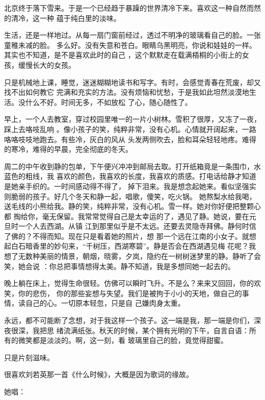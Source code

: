 \documentclass[12pt,a4paper]{article}
\begin{document}
		北京终于落下雪来。于是一个已经趋于暴躁的世界清冷下来。喜欢这一种自然而然的清冷，这一种
	蕴于纯白里的淡味。

		生活，还是一样地过。从每一扇门窗前经过，透过不明净的玻璃看自己的脸。一张童稚未减的脸。
	多么好。没有失意和苍白。眼睛乌黑明亮，你说和娃娃的一样。其实也不知道，是不是喜欢此时的自己
	，这个默默走在载满梧桐的小街上的女孩，缓慢长大的女孩。

		只是机械地上课，睡觉，迷迷糊糊地读书和写字。有时，会感觉青春在荒废，却又找不出如何教它
	完满和充实的方法。没有烦恼和忧愁，于是我如此坦然淡漠地生活。没什么不好。时间无多，不如放松
	了心，随心随性了。

		早上，一个人去教室，穿过校园里唯一的一片小树林。雪积了很厚，又冻了一夜，踩上去咯吱乱响
	。像小孩子的笑，纯粹非常，没有心机。心情就开阔起来，一路咯咯吱吱地跑去。有些冷，灰白的风从
	头发两侧吹去，脸和耳朵轻轻地疼。难得的寒冷，难得的早晨，完全彻底的冬天。

		周二的中午收到静的包单，下午便兴冲冲到邮局去取。打开纸箱竟是一条围巾，水蓝色的粗线，我
	喜欢的颜色，我喜欢的长度，我喜欢的质感。打电话给静才知道是她亲手织的。一时间感动得不得了，
	掉下泪来。我是想念起她来。看似坚强实则脆弱的孩子。好几个冬天和静一起，唱歌，傻笑，吃火锅。
	她熬梨水给我喝，送毛线的小熊给我。静的笑，纯粹非常，没有心机。雪一样。她对你好便把整颗心都
	掏给你，毫无保留。我常常觉得自己是太幸运的了，遇见了静。她说，要在元旦时一个人去西湖。从镇
	江到那里似乎是不太远。还要去灵隐寺拜佛。静何时信了佛的？不得而知。现在只是看着她的照片，想
	那一个远在江南的小女子。就想起白石暗香里的妙句来，“千树压，西湖寒碧”。静是否会在西湖遇见梅
	花呢？我想了无数种美丽的情景，朝烟，晓雾，夕岚，隐约在一树树迷梦里的静。静听了会笑，她会说
	：你总把事情想得太美。静不知道，我是多想同她一起去的。

		晚上躺在床上，觉得生命很轻。仿佛可以瞬时飞升。不是么？来来又回回，你的欢笑，你的悲伤，
	你的那些妄想与失望。我们是被拘于小小的天地，做自己的事情，读自己的心。一切原本轻忽，只是自
	己嫌肉身太重。

		永远，都不可能断了念想，对于我这样一个孩子。这一端是我，那一端是你们，深夜很深，我把思
	绪流满纸张。秋天的时候，某个拥有光明的下午，自言自语：所有的微笑都是淡淡的。啊，这一刻，看
	玻璃里自己的脸，竟觉得甜蜜。

		只是片刻滋味。

	\endwriting



		很喜欢刘若英那一首《什么时候》，大概是因为歌词的缘故。

		她唱：
\end{document}

